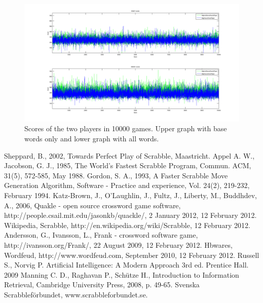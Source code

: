 \documentclass[a4paper, 12pt]{report}
\begin{document}
\begin{figure}
\centering
\includegraphics[scale=0.3]{Highest_Bonus_Round_vs_High_Score_Word_10000}
\caption {Scores of the two players in 10000 games. Upper graph with base words only and lower graph with all words.}
\label{fig:bs+hsw}
\end{figure}



\begin{thebibliography}{100}  
   Sheppard, B., 2002, Towards Perfect Play of Scrabble, Maastricht.
   Appel A. W., Jacobson, G. J., 1985, The World’s Fastest Scrabble Program, Commun. ACM, 31(5), 572-585, May 1988.
 Gordon, S. A., 1993, A Faster Scrabble Move Generation Algorithm, Software - Practice and experience, Vol. 24(2), 219-232, February 1994.
 Katz-Brown, J., O’Laughlin, J., Fultz, J., Liberty, M., Buddhdev, A., 2006, Quakle - open source crossword game software, http://people.csail.mit.edu/jasonkb/quackle/, 2 January 2012,  12 February 2012.
 Wikipedia, Scrabble, http://en.wikipedia.org/wiki/Scrabble, 12 February 2012.
 Andersson, G., Ivansson, L., Frank - crossword software game, http://ivansson.org/Frank/, 22 August 2009, 12 February 2012.
 Hbwares, Wordfeud, http://www.wordfeud.com, September 2010, 12 February 2012.
 Russell S., Norvig P. Artificial Intelligence: A Modern Approach 3rd ed. Prentice Hall. 2009
 Manning C. D., Raghavan P., Schütze H., Introduction to Information Retrieval, Cambridge University Press, 2008, p. 49-65.
 Svenska Scrabbleförbundet, www.scrabbleforbundet.se.
\end{thebibliography}
\end{document}
